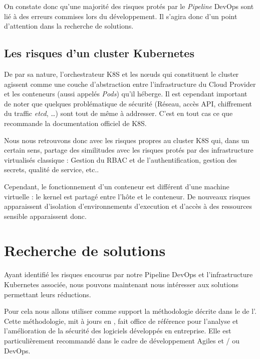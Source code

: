 On constate donc qu'une majorité des risques protés par le \emph{Pipeline} DevOps sont lié à des erreurs commises lors
du développement. Il s'agira donc d'un point d'attention dans la recherche de solutions.

\subsection{Les risques d'un cluster Kubernetes}
De par sa nature, l'orchestrateur \ac{K8S} et les nœuds qui constituent le cluster agissent comme une couche 
d'abstraction entre l'infrastructure du Cloud Provider et les conteneurs (aussi appelés \emph{Pods}) qu'il héberge.
\newline Il est cependant important de noter que quelques problématique de sécurité (\eg Réseau, accès API, chiffrement 
du traffic \emph{etcd}, \dots) sont tout de même à addresser. C'est en tout cas ce que recommande la documentation 
officiel de \ac{K8S}\autocite{k8s_security_2021}.

Nous nous retrouvons donc avec les risques propres au cluster \ac{K8S} qui, dans un certain sens, partage des similitudes
avec les risques protés par des infrastructure virtualisés classique : Gestion du \ac{RBAC} et de l'authentification, 
gestion des secrets, qualité de service, etc..

Cependant, le fonctionnement d'un conteneur est différent d'une machine virtuelle : le kernel est partagé entre l'hôte et
le conteneur. De nouveaux risques apparaissent d'isolation d'environnements d'execution et d'accès à des ressources 
sensible apparaissent donc. 

\newpage

\section{Recherche de solutions}

Ayant identifié les risques encourus par notre Pipeline DevOps et l'infrastructure Kubernetes associée,
nous pouvons maintenant nous intéresser aux solutions permettant leurs réductions.

Pour cela nous allons utiliser comme support la méthodologie décrite dans le 
\autocite{samm_v2.0_owasp_project_2021}
de l'\citeauthor{samm_v2.0_owasp_project_2021}. Cette méthodologie, mit à jours en 
, fait office de référence pour l'analyse et l'amélioration de la sécurité des 
logiciels développés en entreprise.
\newline Elle est particulièrement recommandé dans le cadre de développement Agiles et / ou \linebreak DevOps.

